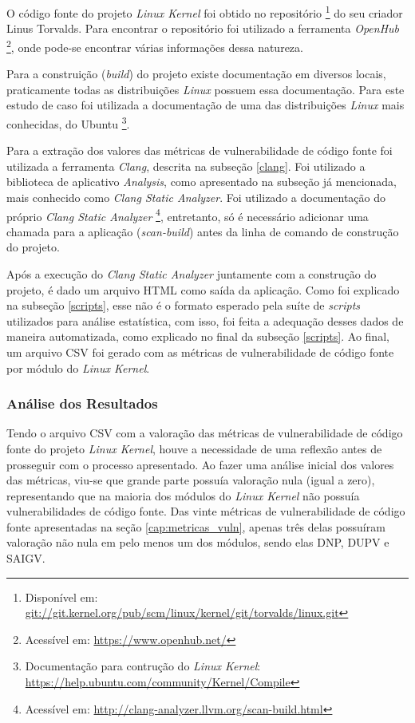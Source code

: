 O código fonte do projeto \emph{Linux Kernel} foi obtido no repositório \footnote{Disponível em:
\url{git://git.kernel.org/pub/scm/linux/kernel/git/torvalds/linux.git}} do seu
criador Linus Torvalds. Para encontrar o repositório foi utilizado a ferramenta
\emph{OpenHub} \footnote{Acessível em: \url{https://www.openhub.net/}}, onde
pode-se encontrar várias informações dessa natureza.

Para a construição (\textit{build}) do projeto existe documentação em diversos
locais, praticamente todas as distribuições \emph{Linux} possuem essa
documentação. Para este estudo de caso foi utilizada a documentação de uma das
distribuições \emph{Linux} mais conhecidas, do Ubuntu \footnote{Documentação para
  contrução do \emph{Linux Kernel}:
\url{https://help.ubuntu.com/community/Kernel/Compile}}.

Para a extração dos valores das métricas de vulnerabilidade de código fonte foi
utilizada a ferramenta \emph{Clang}, descrita na subseção
\ref{clang}. Foi utilizado a biblioteca de aplicativo
\textit{Analysis}, como apresentado na subseção já mencionada, mais conhecido como \emph{Clang Static
Analyzer}. Foi utilizado a documentação do próprio \emph{Clang Static Analyzer}
\footnote{Acessível em: \url{http://clang-analyzer.llvm.org/scan-build.html}},
entretanto, só é necessário adicionar uma chamada para a aplicação
(\textit{scan-build}) antes da linha de comando de construção do projeto.

Após a execução do \emph{Clang Static Analyzer} juntamente com a construção do
projeto, é dado um arquivo HTML como saída da aplicação. Como foi explicado na
subseção \ref{scripts}, esse não é o formato esperado pela suíte de
\textit{scripts} utilizados para análise estatística, com isso, foi feita a
adequação desses dados de maneira automatizada, como explicado no final da
subseção \ref{scripts}. Ao final, um arquivo CSV foi gerado com as métricas de
vulnerabilidade de código fonte por módulo do \emph{Linux Kernel}.

\subsubsection{Análise dos Resultados}

Tendo o arquivo CSV com a valoração das métricas de vulnerabilidade de código
fonte do projeto \emph{Linux Kernel}, houve a necessidade de uma reflexão antes
de prosseguir com o processo apresentado. Ao
fazer uma análise inicial dos valores das métricas, viu-se que grande parte
possuía valoração nula (igual a zero), representando que na maioria dos módulos
do \emph{Linux Kernel} não possuía vulnerabilidades de código fonte. Das vinte
métricas de vulnerabilidade de código fonte apresentadas na seção
\ref{cap:metricas_vuln}, apenas três delas possuíram valoração não nula em pelo
menos um dos módulos, sendo elas DNP, DUPV e SAIGV. 

